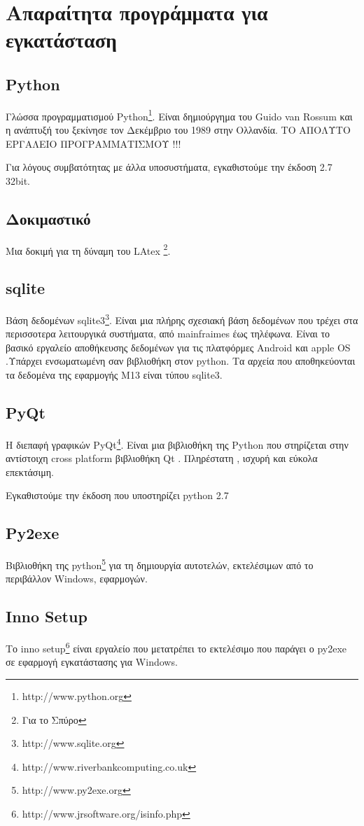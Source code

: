 \documentclass[A4,10pt,greek]{book}
\begin{document}
\section{Απαραίτητα προγράμματα για εγκατάσταση}

\subsection{Python}
Γλώσσα προγραμματισμού Python\footnote{http://www.python.org}. Είναι δημιούργημα του Guido van Rossum και η ανάπτυξή του ξεκίνησε τον Δεκέμβριο του 1989 στην Ολλανδία. ΤΟ ΑΠΟΛΥΤΟ ΕΡΓΑΛΕΙΟ ΠΡΟΓΡΑΜΜΑΤΙΣΜΟΥ !!!

Για λόγους συμβατότητας με άλλα υποσυστήματα, εγκαθιστούμε την έκδοση 2.7 32bit.

\subsection{Δοκιμαστικό}
Μια δοκιμή για τη δύναμη του LAtex \footnote{Για το Σπύρο}.   

\subsection{sqlite}
Bάση δεδομένων  sqlite3\footnote{http://www.sqlite.org}.  Είναι μια πλήρης σχεσιακή βάση δεδομένων που τρέχει στα περισσοτερα  λειτουργικά συστήματα, από mainfraimes έως τηλέφωνα. Είναι το βασικό εργαλείο αποθήκευσης δεδομένων για τις πλατφόρμες Android και apple OS  .Υπάρχει ενσωματωμένη σαν βιβλιοθήκη στον python. Τα αρχεία που αποθηκεύονται τα δεδομένα της εφαρμογής Μ13 είναι τύπου sqlite3. 

\subsection{PyQt}
Η διεπαφή γραφικών  PyQt\footnote{http://www.riverbankcomputing.co.uk}. Είναι μια βιβλιοθήκη της Python που στηρίζεται στην αντίστοιχη cross platform βιβλιοθήκη Qt . Πληρέστατη , ισχυρή και εύκολα επεκτάσιμη.

Εγκαθιστούμε την έκδοση που υποστηρίζει python 2.7

\subsection{Py2exe}
Βιβλιοθήκη της python\footnote{http://www.py2exe.org} για τη δημιουργία αυτοτελών, εκτελέσιμων από το περιβάλλον Windows, εφαρμογών.

\subsection{Inno Setup}
 Το inno setup\footnote{http://www.jrsoftware.org/isinfo.php} είναι εργαλείο που μετατρέπει το εκτελέσιμο που παράγει ο py2exe σε εφαρμογή εγκατάστασης για Windows.
\end{document}
